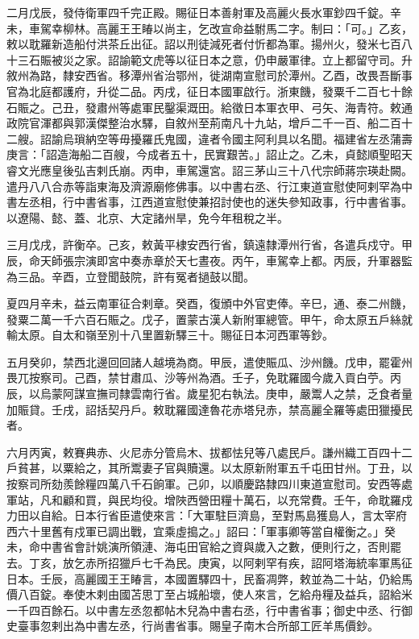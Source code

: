 \begin{pinyinscope}
 二月戊辰，發侍衛軍四千完正殿。賜征日本善射軍及高麗火長水軍鈔四千錠。辛未，車駕幸柳林。高麗王王睶以尚主，乞改宣命益駙馬二字。制曰：「可。」乙亥，敕以耽羅新造船付洪茶丘出征。詔以刑徒減死者付忻都為軍。揚州火，發米七百八十三石賑被災之家。詔諭範文虎等以征日本之意，仍申嚴軍律。立上都留守司。升敘州為路，隸安西省。移潭州省治鄂州，徙湖南宣慰司於潭州。乙酉，改畏吾斷事官為北庭都護府，升從二品。丙戌，征日本國軍啟行。浙東饑，發粟千二百七十餘石賑之。己丑，發肅州等處軍民鑿渠溉田。給徵日本軍衣甲、弓矢、海青符。敕通政院官渾都與郭漢傑整治水驛，自敘州至荊南凡十九站，增戶二千一百、船二百十二艘。詔諭烏瑣納空等毋擾羅氏鬼國，違者令國主阿利具以名聞。福建省左丞蒲壽庚言：「詔造海船二百艘，今成者五十，民實艱苦。」詔止之。乙未，貞懿順聖昭天睿文光應皇後弘吉剌氏崩。丙申，車駕還宮。詔三茅山三十八代宗師蔣宗瑛赴闕。遣丹八八合赤等詣東海及濟源廟修佛事。以中書右丞、行江東道宣慰使阿剌罕為中書左丞相，行中書省事，江西道宣慰使兼招討使也的迷失參知政事，行中書省事。以遼陽、懿、蓋、北京、大定諸州旱，免今年租稅之半。



 三月戊戌，許衡卒。己亥，敕黃平棣安西行省，鎮遠隸潭州行省，各遣兵戍守。甲辰，命天師張宗演即宮中奏赤章於天七晝夜。丙午，車駕幸上都。丙辰，升軍器監為三品。辛酉，立登聞鼓院，許有冤者撾鼓以聞。



 夏四月辛未，益云南軍征合剌章。癸酉，復頒中外官吏俸。辛巳，通、泰二州饑，發粟二萬一千六百石賑之。戊子，置蒙古漢人新附軍總管。甲午，命太原五戶絲就輸太原。自太和嶺至別十八里置新驛三十。賜征日本河西軍等鈔。



 五月癸卯，禁西北邊回回諸人越境為商。甲辰，遣使賑瓜、沙州饑。戊申，罷霍州畏兀按察司。己酉，禁甘肅瓜、沙等州為酒。壬子，免耽羅國今歲入貢白苧。丙辰，以烏蒙阿謀宣撫司隸雲南行省。歲星犯右執法。庚申，嚴鬻人之禁，乏食者量加賑貸。壬戌，詔括契丹戶。敕耽羅國達魯花赤塔兒赤，禁高麗全羅等處田獵擾民者。



 六月丙寅，敕賽典赤、火尼赤分管烏木、拔都怯兒等八處民戶。謙州織工百四十二戶貧甚，以粟給之，其所鬻妻子官與贖還。以太原新附軍五千屯田甘州。丁丑，以按察司所劾羨餘糧四萬八千石餉軍。己卯，以順慶路隸四川東道宣慰司。安西等處軍站，凡和顧和買，與民均役。增陜西營田糧十萬石，以充常費。壬午，命耽羅戍力田以自給。日本行省臣遣使來言：「大軍駐巨濟島，至對馬島獲島人，言太宰府西六十里舊有戍軍已調出戰，宜乘虛搗之。」詔曰：「軍事卿等當自權衡之。」癸未，命中書省會計姚演所領漣、海屯田官給之資與歲入之數，便則行之，否則罷去。丁亥，放乞赤所招獵戶七千為民。庚寅，以阿剌罕有疾，詔阿塔海統率軍馬征日本。壬辰，高麗國王王睶言，本國置驛四十，民畜凋弊，敕並為二十站，仍給馬價八百錠。奉使木剌由國苫思丁至占城船壞，使人來言，乞給舟糧及益兵，詔給米一千四百餘石。以中書左丞忽都帖木兒為中書右丞，行中書省事；御史中丞、行御史臺事忽剌出為中書左丞，行尚書省事。賜皇子南木合所部工匠羊馬價鈔。




\end{pinyinscope}
